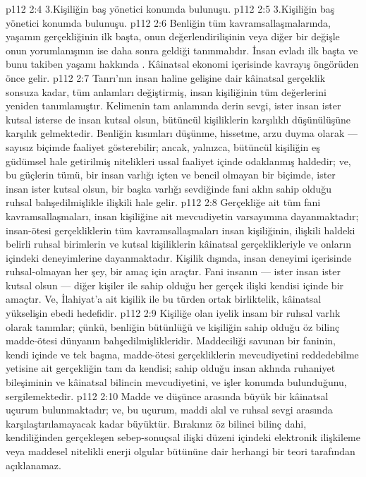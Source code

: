 \vs p112 2:4 3.\bibnobreakspace Kişiliğin baş yönetici konumda bulunuşu.
\vs p112 2:5 3.\bibnobreakspace Kişiliğin baş yönetici konumda bulunuşu.
\vs p112 2:6 Benliğin tüm kavramsallaşmalarında, yaşamın gerçekliğinin ilk başta, onun değerlendirilişinin veya diğer bir değişle onun yorumlanışının ise daha sonra geldiği tanınmalıdır. İnsan evladı ilk başta  ve bunu takiben yaşamı hakkında . Kâinatsal ekonomi içerisinde kavrayış öngörüden önce gelir.
\vs p112 2:7 Tanrı’nın insan haline gelişine dair kâinatsal gerçeklik sonsuza kadar, tüm anlamları değiştirmiş, insan kişiliğinin tüm değerlerini yeniden tanımlamıştır. Kelimenin tam anlamında derin sevgi, ister insan ister kutsal isterse de insan  kutsal olsun, bütüncül kişiliklerin karşılıklı düşünülüşüne karşılık gelmektedir. Benliğin kısımları düşünme, hissetme, arzu duyma olarak --- sayısız biçimde faaliyet gösterebilir; ancak, yalnızca, bütüncül kişiliğin eş güdümsel hale getirilmiş nitelikleri ussal faaliyet içinde odaklanmış haldedir; ve, bu güçlerin tümü, bir insan varlığı içten ve bencil olmayan bir biçimde, ister insan ister kutsal olsun, bir başka varlığı sevdiğinde fani aklın sahip olduğu ruhsal bahşedilmişlikle ilişkili hale gelir.
\vs p112 2:8 Gerçekliğe ait tüm fani kavramsallaşmaları, insan kişiliğine ait mevcudiyetin varsayımına dayanmaktadır; insan\hyp{}ötesi gerçekliklerin tüm kavramsallaşmaları insan kişiliğinin, ilişkili haldeki belirli ruhsal birimlerin ve kutsal kişiliklerin kâinatsal gerçeklikleriyle ve onların içindeki deneyimlerine dayanmaktadır. Kişilik dışında, insan deneyimi içerisinde ruhsal\hyp{}olmayan her şey, bir amaç için araçtır. Fani insanın --- ister insan ister kutsal olsun --- diğer kişiler ile sahip olduğu her gerçek ilişki kendisi içinde bir amaçtır. Ve, İlahiyat’a ait kişilik ile bu türden ortak birliktelik, kâinatsal yükselişin ebedi hedefidir.
\vs p112 2:9 Kişiliğe olan iyelik insanı bir ruhsal varlık olarak tanımlar; çünkü, benliğin bütünlüğü ve kişiliğin sahip olduğu öz bilinç madde\hyp{}ötesi dünyanın bahşedilmişlikleridir. Maddeciliği savunan bir faninin, kendi içinde ve tek başına, madde\hyp{}ötesi gerçekliklerin mevcudiyetini reddedebilme yetisine ait gerçekliğin tam da kendisi; sahip olduğu insan aklında ruhaniyet bileşiminin ve kâinatsal bilincin mevcudiyetini, ve işler konumda bulunduğunu, sergilemektedir.
\vs p112 2:10 Madde ve düşünce arasında büyük bir kâinatsal uçurum bulunmaktadır; ve, bu uçurum, maddi akıl ve ruhsal sevgi arasında karşılaştırılamayacak kadar büyüktür. Bırakınız öz bilinci bilinç dahi, kendiliğinden gerçekleşen sebep\hyp{}sonuçsal ilişki düzeni içindeki elektronik ilişkileme veya maddesel nitelikli enerji olgular bütününe dair herhangi bir teori tarafından açıklanamaz.
